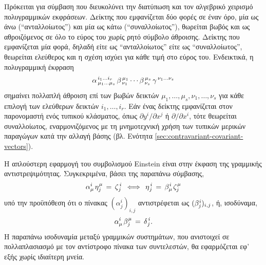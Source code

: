 \documentclass[11pt,a4paper,twoside,openright]{book}
\begin{document}
Πρόκειται για σύμβαση που διευκολύνει την διατύπωση και τον αλγεβρικό χειρισμό πολυγραμμικών εκφράσεων. Δείκτης που εμφανίζεται δύο φορές σε έναν όρο, μία ως άνω (``ανταλλοίωτος'') και μία ως κάτω (``συναλλοίωτος''), θωρείται βωβός και ως αθροιζόμενος σε όλο το εύρος του χωρίς ρητό σύμβολο άθροισης. Δείκτης που εμφανίζεται μία φορά, δηλαδή είτε ως ``ανταλλοίωτος'' είτε ως ``συναλλοίωτος'', θεωρείται ελεύθερος και η σχέση ισχύει για κάθε τιμή στο εύρος του.
Ενδεικτικά, η πολυγραμμική έκφραση
\begin{equation*}
\alpha^{\,i_1 \dots i_r}_{\hspace{1.5pt}\mu_1 \dots \mu_s}
\,
\beta^{\,\mu_1}_{\hspace{1.5pt}\nu_1}
\cdots
\beta^{\,\mu_s}_{\hspace{1.5pt}\nu_s}
\,
\gamma^{\,\nu_1 \dots \nu_s}
\end{equation*}
σημαίνει πολλαπλή άθροιση επί των βωβών δεικτών $\mu_1, \dots, \mu_s, \nu_1, \dots, \nu_s$ για κάθε επιλογή των ελεύθερων δεικτών $i_1, \dots, i_r$.
Εάν ένας δείκτης εμφανίζεται στον παρονομαστή ενός τυπικού κλάσματος, όπως $\partial y^i/\partial x^j$ ή $\partial/\partial x^i$, τότε θεωρείται συναλλοίωτος,
εναρμονιζόμενος με τη μνημοτεχνική χρήση των τυπικών μερικών παραγώγων κατά την αλλαγή βάσης (βλ. Eνότητα \ref{sec:contravariant-covariant-vectors}).

Η απλούστερη εφαρμογή του συμβολισμού Einstein είναι στην έκφαση της γραμμικής αντιστρεψιμότητας. Συγκεκριμένα,
βάσει της παραπάνω σύμβασης,
\begin{equation*}\label{eq:linear-inversion-tensor-form}
\alpha^i_{\mu} \hspace{1pt} \eta^{\hspace{.5pt}\mu}_j
\,=\,
\zeta^{\,i}_{\hspace{.5pt}j}
\,\iff\,
\eta^{\,i}_{\hspace{.5pt}j}
\,=\,
\beta^{\hspace{.5pt}i}_{\mu} \hspace{1pt} \zeta^{\hspace{.5pt}\mu}_j
\end{equation*}
υπό την προϋπόθεση ότι ο πίνακας $(\alpha^i_j)_{i,j}$
αντιστρέφεται ως $(\beta^{\hspace{.5pt}i}_j)_{i,j}$, ή, ισοδύναμα,
\begin{equation*}\label{eq:inverse-matrix-tensor-form}
\alpha^i_{\mu} \hspace{1pt} \beta^{\hspace{.5pt}\mu}_j
\,=\,
\delta^{\,i}_{\hspace{.5pt}j}.
\end{equation*}
Η παραπάνω ισοδυναμία μεταξύ γραμμικών συστημάτων, που ανιστοιχεί σε πολλαπλασιασμό με τον αντίστροφο πίνακα των συντελεστών,
θα εφαρμόζεται εφ' εξής χωρίς ιδιαίτερη μνεία.
\end{document}
